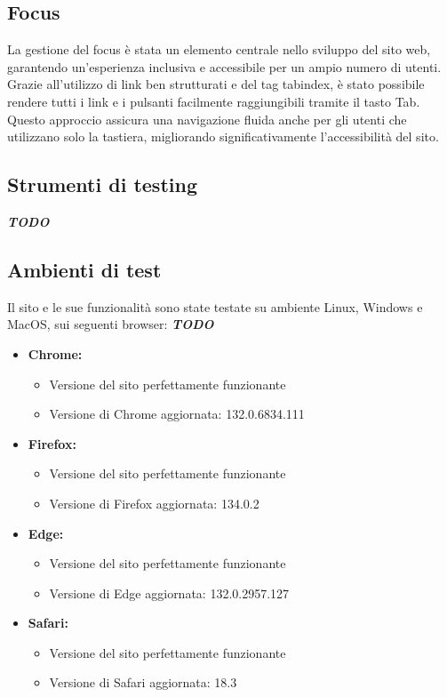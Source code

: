 \subsection{Focus}
La gestione del focus è stata un elemento centrale nello sviluppo del sito web, garantendo un’esperienza inclusiva e accessibile per un ampio numero di utenti. Grazie all’utilizzo di link ben strutturati e del tag tabindex, è stato possibile rendere tutti i link e i pulsanti facilmente raggiungibili tramite il tasto Tab. Questo approccio assicura una navigazione fluida anche per gli utenti che utilizzano solo la tastiera, migliorando significativamente l’accessibilità del sito.
\subsection{Strumenti di testing}
\textbf{\textit{TODO}}
\subsection{Ambienti di test}
Il sito e le sue funzionalità sono state testate su ambiente Linux, Windows e MacOS, sui seguenti browser: \textbf{\textit{TODO}}
\begin{itemize}
    \item \textbf{Chrome:}
        \begin{itemize}
            \item Versione del sito perfettamente funzionante
            \item Versione di Chrome aggiornata: 132.0.6834.111
        \end{itemize}
    \item \textbf{Firefox:}
        \begin{itemize}
            \item Versione del sito perfettamente funzionante
            \item Versione di Firefox aggiornata: 134.0.2
        \end{itemize}
    \item \textbf{Edge:} 
        \begin{itemize}
            \item Versione del sito perfettamente funzionante
            \item Versione di Edge aggiornata: 132.0.2957.127
        \end{itemize}
    \item \textbf{Safari:} 
        \begin{itemize}
            \item Versione del sito perfettamente funzionante
            \item Versione di Safari aggiornata: 18.3
        \end{itemize}
\end{itemize}
